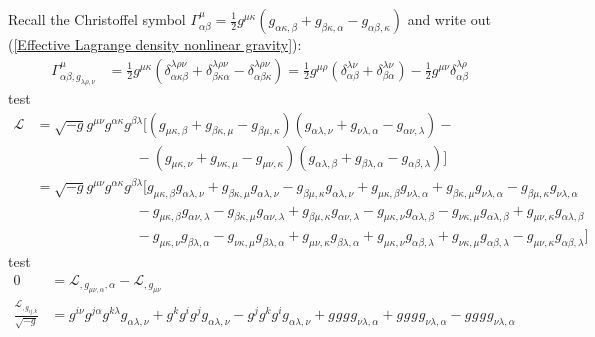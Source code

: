\documentclass[a4paper,12pt]{article}
\begin{document}
Recall the Christoffel symbol $\Gamma^\mu_{\alpha\beta}=\frac{1}{2}g^{\mu\kappa}(g_{\alpha\kappa,\beta}+g_{\beta\kappa,\alpha}-g_{\alpha\beta,\kappa})$ and write out (\ref{Effective Lagrange density nonlinear gravity}):
\begin{align*}
\Gamma^\mu_{\alpha\beta,g_{\lambda\rho,\nu}}&=\frac{1}{2}g^{\mu\kappa}(\delta^{\lambda\rho\nu}_{\alpha\kappa\beta}+\delta^{\lambda\rho\nu}_{\beta\kappa\alpha}-\delta^{\lambda\rho\nu}_{\alpha\beta\kappa})=\frac{1}{2}g^{\mu\rho}(\delta^{\lambda\nu}_{\alpha\beta}+\delta^{\lambda\nu}_{\beta\alpha})-\frac{1}{2}g^{\mu\nu}\delta^{\lambda\rho}_{\alpha\beta}
\end{align*}
test
\begin{align*}
\mathcal{L}&=\sqrt{-g}g^{\mu\nu}g^{\alpha\kappa}g^{\beta\lambda}\big[ (g_{\mu\kappa,\beta}+g_{\beta\kappa,\mu}-g_{\beta\mu,\kappa})(g_{\alpha\lambda,\nu}+g_{\nu\lambda,\alpha}-g_{\alpha\nu,\lambda}) -\\
&\hspace{3cm}-(g_{\mu\kappa,\nu}+g_{\nu\kappa,\mu}-g_{\mu\nu,\kappa})(g_{\alpha\lambda,\beta}+g_{\beta\lambda,\alpha}-g_{\alpha\beta,\lambda})\big]\\
&=\sqrt{-g}g^{\mu\nu}g^{\alpha\kappa}g^{\beta\lambda}\big[g_{\mu\kappa,\beta}g_{\alpha\lambda,\nu}+g_{\beta\kappa,\mu}g_{\alpha\lambda,\nu}-g_{\beta\mu,\kappa}g_{\alpha\lambda,\nu}+g_{\mu\kappa,\beta}g_{\nu\lambda,\alpha}+g_{\beta\kappa,\mu}g_{\nu\lambda,\alpha}-g_{\beta\mu,\kappa}g_{\nu\lambda,\alpha}\\
&\hspace{3cm} -g_{\mu\kappa,\beta}g_{\alpha\nu,\lambda}-g_{\beta\kappa,\mu}g_{\alpha\nu,\lambda}+g_{\beta\mu,\kappa}g_{\alpha\nu,\lambda}-g_{\mu\kappa,\nu}g_{\alpha\lambda,\beta}-g_{\nu\kappa,\mu}g_{\alpha\lambda,\beta}+g_{\mu\nu,\kappa}g_{\alpha\lambda,\beta}\\
&\hspace{3cm} -g_{\mu\kappa,\nu}g_{\beta\lambda,\alpha}-g_{\nu\kappa,\mu}g_{\beta\lambda,\alpha}+g_{\mu\nu,\kappa}g_{\beta\lambda,\alpha}+g_{\mu\kappa,\nu}g_{\alpha\beta,\lambda}+g_{\nu\kappa,\mu}g_{\alpha\beta,\lambda}-g_{\mu\nu,\kappa}g_{\alpha\beta,\lambda}\big]
\end{align*}
test
\begin{align*}
0&=\mathcal{L}_{,g_{\mu\nu,\alpha},\alpha}-\mathcal{L}_{,g_{\mu\nu}}\\
\frac{\mathcal{L}_{,g_{ij,k}}}{\sqrt{-g}}&=g^{i\nu}g^{j\alpha}g^{k\lambda}g_{\alpha\lambda,\nu}+g^{k}g^{i}g^{j}g_{\alpha\lambda,\nu}-g^{j}g^{k}g^{i}g_{\alpha\lambda,\nu}+g^{}g^{}g^{}g_{\nu\lambda,\alpha}+g^{}g^{}g^{}g_{\nu\lambda,\alpha}-g^{}g^{}g^{}g_{\nu\lambda,\alpha}
\end{align*}
\end{document}
